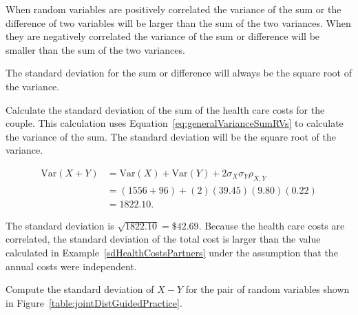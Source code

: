 When random variables are positively correlated the variance of the sum or the difference of two variables will be larger than the sum of the two variances. When they are negatively correlated the variance of the sum or difference  will be smaller than the sum of the two variances. 

The standard deviation for the sum or difference will always be the square root of the variance.

\begin{examplewrap}
\begin{nexample}{Calculate the standard deviation of the sum of the health care costs for the couple.}
	This calculation uses Equation~\ref{eq:generalVarianceSumRVs} to calculate the variance of the sum.  The standard deviation will be the square root of the variance.
	
	\begin{align*} 
	\text{Var}(X + Y) &= \text{Var}(X) + \text{Var}(Y) + 
	2 \sigma_X \sigma_Y \rho_{X,Y} \\
	&= (1556 + 96) + (2)(39.45)(9.80)(0.22) \\
	& = 1822.10.
	\end{align*}
	
    The standard deviation is $\sqrt{1822.10} = \$42.69$.  Because the health care costs are correlated, the standard deviation of the total cost is larger than the value calculated in Example~\ref{sdHealthCostsPartners} under the assumption that the annual costs were independent.
\end{nexample}
\end{examplewrap}

\begin{exercisewrap}
\begin{nexercise}
Compute the standard deviation of $X - Y$ for the pair of random variables shown in Figure~\ref{table:jointDistGuidedPractice}.\footnotemark{}
\end{nexercise}
\end{exercisewrap}

\textD{\newpage}

